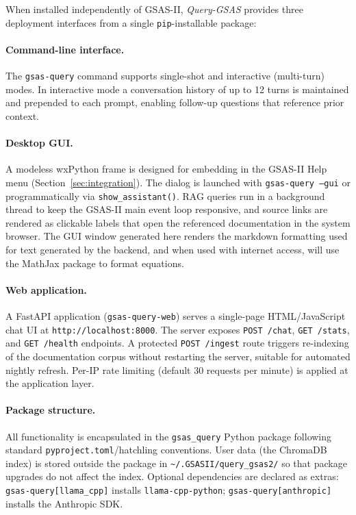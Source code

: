 When installed independently of GSAS-II, \textit{Query-GSAS} provides three deployment interfaces from a single \texttt{pip}-installable package:

\paragraph{Command-line interface.}
The \texttt{gsas-query} command supports single-shot and interactive
(multi-turn) modes.
In interactive mode a conversation history of up to 12 turns is
maintained and prepended to each prompt, enabling follow-up questions
that reference prior context.

\paragraph{Desktop GUI.}
A modeless wxPython frame is designed for embedding in the GSAS-II
Help menu (Section~\ref{sec:integration}).
The dialog is launched with \texttt{gsas-query --gui} or
programmatically via \texttt{show\_assistant()}.
RAG queries run in a background thread to keep the GSAS-II
main event loop responsive, and source links are rendered as
clickable labels that open the referenced documentation in
the system browser. The GUI window generated here renders the markdown formatting used for text generated by the backend, and when used with internet access, will use the MathJax package to format equations.

\paragraph{Web application.}
A FastAPI application (\texttt{gsas-query-web}) serves a single-page
HTML/JavaScript chat UI at \texttt{http://localhost:8000}.
The server exposes \texttt{POST /chat}, \texttt{GET /stats}, and
\texttt{GET /health} endpoints.
A protected \texttt{POST /ingest} route triggers re-indexing of
the documentation corpus without restarting the server, suitable
for automated nightly refresh.
Per-IP rate limiting (default 30 requests per minute) is applied
at the application layer.

\paragraph{Package structure.}
All functionality is encapsulated in the \texttt{gsas\_query} Python
package following standard \texttt{pyproject.toml}/hatchling conventions.
User data (the ChromaDB index) is stored outside the package in
\texttt{\textasciitilde/.GSASII/query\_gsas2/} so that package upgrades do
not affect the index.
Optional dependencies are declared as extras:
\texttt{gsas-query[llama\_cpp]} installs \texttt{llama-cpp-python};
\texttt{gsas-query[anthropic]} installs the Anthropic SDK.
